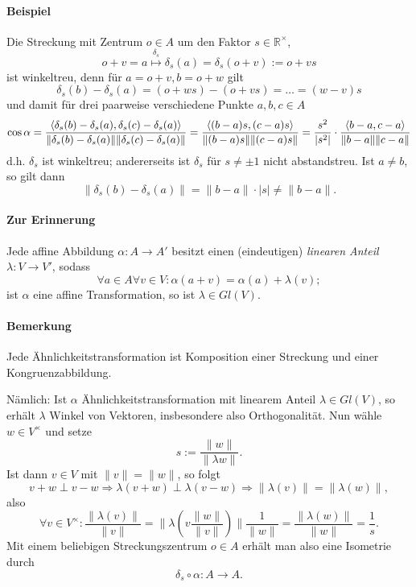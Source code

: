 \paragraph{Beispiel}
	Die Streckung mit Zentrum $ o\in A $ um den Faktor $ s\in \mathbb{R}^\times $,
		\[ o+v=a\overset{\delta_s}{\mapsto}\delta_s(a) = \delta_s(o+v):= o+vs \]
	ist winkeltreu, denn für $ a=o+v, b=o+w $ gilt
		\[ \delta_s(b)-\delta_s(a) = (o+ws)-(o+vs) = \dots = (w-v)s \]
	und damit für drei paarweise verschiedene Punkte $ a,b,c\in A $
		\[ \cos \alpha = \frac{\langle \delta_s(b)-\delta_s(a),\delta_s(c)-\delta_s(a) \rangle}{\|\delta_s(b)-\delta_s(a)\|\|\delta_s(c)-\delta_s(a)\|} = \frac{\langle (b-a)s,(c-a)s \rangle}{\|(b-a)s\|\|(c-a)s\|} =\frac{s^2}{|s^2|} \cdot \frac{\langle b-a,c-a \rangle}{\|b-a\|\|c-a\|} \]
	d.h. $ \delta_s $ ist winkeltreu; andererseits ist $ \delta_s $ für $ s\neq \pm 1 $ nicht abstandstreu.
	Ist $ a \neq b $, so gilt dann
	\[ \|\delta_s(b)-\delta_s(a)\| = \|b-a\|\cdot |s| \neq \|b-a\|. \] 
\begin{minipage}[t]{0.45\linewidth}
		\centering
 		
\end{minipage}
\hfill
\begin{minipage}[t]{0.45\linewidth}
		\centering
		
\end{minipage}		

\paragraph{Zur Erinnerung}
	Jede affine Abbildung $ \alpha:A\to A' $ besitzt einen (eindeutigen) \emph{linearen Anteil} $ \lambda:V\to V' $, sodass
		\[ \forall a\in A\forall v\in V: \alpha(a+v) = \alpha(a)+\lambda(v); \]
	ist $ \alpha $ eine affine Transformation, so ist $ \lambda \in Gl(V) $.
\paragraph{Bemerkung}
	Jede Ähnlichkeitstransformation ist Komposition einer Streckung und einer Kongruenzabbildung.
	
	Nämlich: Ist $ \alpha $ Ähnlichkeitstransformation mit linearem Anteil $ \lambda\in Gl(V) $, so erhält $ \lambda $ Winkel von Vektoren, insbesondere also Orthogonalität.
	Nun wähle $ w\in V^\times $ und setze
		\[ s := \frac{\|w\|}{\|\lambda w\|}. \]
	Ist dann $ v\in V $ mit $ \|v\|=\|w\| $, so folgt
		\[ v+w \perp v-w \Rightarrow \lambda(v+w)\perp \lambda(v-w) \Rightarrow \|\lambda(v)\| = \|\lambda(w)\|, \]
	also 
		\[ \forall v\in V^\times: \frac{\|\lambda(v)\|}{\|v\|} = \|\lambda(v\frac{\|w\|}{\|v\|})\|\frac{1}{\|w\|} = \frac{\|\lambda (w)\|}{\|w\|} = \frac{1}{s}. \]
	Mit einem beliebigen Streckungszentrum $ o\in A $ erhält man also eine Isometrie durch
		\[ \delta_s\circ \alpha :A\to A. \]
